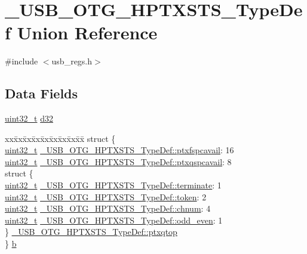 \hypertarget{union___u_s_b___o_t_g___h_p_t_x_s_t_s___type_def}{\section{\-\_\-\-U\-S\-B\-\_\-\-O\-T\-G\-\_\-\-H\-P\-T\-X\-S\-T\-S\-\_\-\-Type\-Def Union Reference}
\label{union___u_s_b___o_t_g___h_p_t_x_s_t_s___type_def}
}


{\ttfamily \#include $<$usb\-\_\-regs.\-h$>$}

\subsection*{Data Fields}
\begin{DoxyCompactItemize}
\item 
\hyperlink{stdint_8h_a435d1572bf3f880d55459d9805097f62}{uint32\-\_\-t} \hyperlink{group___u_s_b___o_t_g___d_r_i_v_e_r_ga37309ecbbd147a4d89043f7e73582dc4}{d32}
\item 
\begin{tabbing}
xx\=xx\=xx\=xx\=xx\=xx\=xx\=xx\=xx\=\kill
struct \{\\
\>\hyperlink{stdint_8h_a435d1572bf3f880d55459d9805097f62}{uint32\_t} \hyperlink{group___u_s_b___o_t_g___d_r_i_v_e_r_gac17dfee021a7eb4609cb89ca945f7c21}{\_USB\_OTG\_HPTXSTS\_TypeDef::ptxfspcavail}: 16\\
\>\hyperlink{stdint_8h_a435d1572bf3f880d55459d9805097f62}{uint32\_t} \hyperlink{group___u_s_b___o_t_g___d_r_i_v_e_r_ga59b1038925aee3e4714ff80a613b03d7}{\_USB\_OTG\_HPTXSTS\_TypeDef::ptxqspcavail}: 8\\
\>struct \{\\
\>\>\hyperlink{stdint_8h_a435d1572bf3f880d55459d9805097f62}{uint32\_t} \hyperlink{group___u_s_b___o_t_g___d_r_i_v_e_r_ga881f78bc7a8ff5748d6de34919c171eb}{\_USB\_OTG\_HPTXSTS\_TypeDef::terminate}: 1\\
\>\>\hyperlink{stdint_8h_a435d1572bf3f880d55459d9805097f62}{uint32\_t} \hyperlink{group___u_s_b___o_t_g___d_r_i_v_e_r_gab78bb9c560c5ce625d76f00ff4b70791}{\_USB\_OTG\_HPTXSTS\_TypeDef::token}: 2\\
\>\>\hyperlink{stdint_8h_a435d1572bf3f880d55459d9805097f62}{uint32\_t} \hyperlink{group___u_s_b___o_t_g___d_r_i_v_e_r_ga90c08b176500a5c5a70082a3aae318b2}{\_USB\_OTG\_HPTXSTS\_TypeDef::chnum}: 4\\
\>\>\hyperlink{stdint_8h_a435d1572bf3f880d55459d9805097f62}{uint32\_t} \hyperlink{group___u_s_b___o_t_g___d_r_i_v_e_r_ga668937b5e6c1ce05ba41a2b1a71dcddd}{\_USB\_OTG\_HPTXSTS\_TypeDef::odd\_even}: 1\\
\>\} \hyperlink{group___u_s_b___o_t_g___d_r_i_v_e_r_ga27abaf7538c680194e1929d78f1caa40}{\_USB\_OTG\_HPTXSTS\_TypeDef::ptxqtop}\\
\} \hyperlink{group___u_s_b___o_t_g___d_r_i_v_e_r_gac7c9a4fe4962dfe7e3b99be029c29264}{b}\\

\end{tabbing}\end{DoxyCompactItemize}


